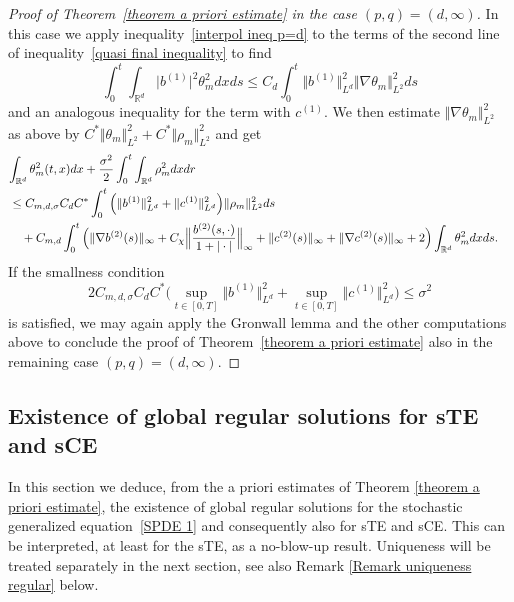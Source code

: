 \documentclass[a4paper,10pt]{article}
\newcommand\1{\mathbbm{1}}
\numberwithin{equation}{section}
\begin{document}
\begin{proof}[Proof of Theorem~\ref{theorem a priori estimate} in the case
$(p,q) =(d,\infty)$] 
In this case we apply inequality~\eqref{interpol ineq p=d} to the terms of the second line of
inequality~\eqref{quasi final inequality} to find
\begin{equation*}
\int_{0}^{t}\int_{\mathbb{R}^{d}} \vert b^{(1)} \vert
^{2}\theta_{m}^{2}dxds  \leq C_d \int_{0}^{t} \Vert b^{(1) }\Vert _{L^{d}}^2 \Vert \nabla \theta_m \Vert_{L^{2}}^2 ds
\end{equation*}
and an analogous inequality for the term with $c^{(1)}$. We then estimate $\Vert \nabla\theta_{m} \Vert _{L^{2}}^{2}$ as above by $C^{\ast} \Vert \theta_{m} \Vert _{L^{2}}^{2}+C^{\ast} \Vert \rho_{m} \Vert _{L^{2} 
}^{2}$ and get
\begin{align*}
\lefteqn{ \int_{\mathbb{R}^{d}}\theta_{m}^{2}(t,x)dx+\frac{\sigma^{2}}{2}\int_{0} 
^{t}\int_{\mathbb{R}^{d}}\rho_{m}^{2}dxdr } \\
&  \leq C_{m,d,\sigma}C_{d}C^{\ast}\int_{0}^{t} \Big(  \Vert b^{(1) }\Vert _{L^{d}}^2 + \Vert c^{(1) }\Vert _{L^{d}}^2 \Big)  \Vert \rho_{m} \Vert _{L^{2}}^{2}ds\\
& \quad{}  +C_{m,d}\int_{0}^{t} \Big( \Vert \nabla b^{(2)}(s) \Vert_{\infty}+
C_{\chi}\Big\Vert \frac{b^{(2)}(s,\cdot) }{1+\vert \cdot \vert }\Big \Vert
_{\infty}+ \Vert c^{(2)}(s) \Vert _{\infty}+ \Vert \nabla c^{(2)
}(s) \Vert _{\infty} +2 \Big)  \int_{\mathbb{R}^{d}}\theta_{m}^{2}dxds .
\end{align*}
If the smallness condition
\begin{equation}
2C_{m,d,\sigma}C_{d}C^{\ast} \big(\sup_{t\in [0,T]  }  \Vert b^{(1) }\Vert _{L^{d}}^2 +\sup_{t\in [0,T]}  \Vert c^{(1) }\Vert _{L^{d}}^2 \big)  \leq\sigma^{2}\label{precise smallness} 
\end{equation}
is satisfied, we may again apply the Gronwall lemma and the other computations above to conclude the proof of Theorem~\ref{theorem a priori estimate} also in the remaining case $(p,q) =(d,\infty)$.
\end{proof}

\subsection{Existence of global regular solutions for sTE and sCE\label{subsection regularity results}}

In this section we deduce, from the a priori estimates of Theorem
\ref{theorem a priori estimate}, the existence of global regular
solutions for the stochastic generalized equation~\eqref{SPDE 1} and consequently also for sTE and sCE. This can be interpreted, at least for the sTE, as a no-blow-up result. Uniqueness will be treated separately in the next section, see also Remark
\ref{Remark uniqueness regular} below. 
\end{document}

